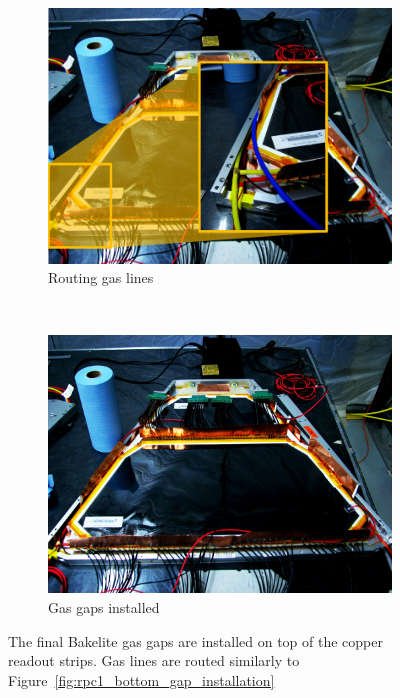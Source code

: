 \begin{figure}
  \centering
  \begin{subfigure}[b]{0.5\textwidth}
    \centering
    \includegraphics[width=\linewidth]{./figures/rpc1_construction_6b.jpg}
    \caption{Routing gas lines}
    \label{fig:rpc1_top_gas_line_detail}
  \end{subfigure}%
  ~
  \begin{subfigure}[b]{0.5\textwidth}
    \centering
    \includegraphics[width=\linewidth]{./figures/rpc1_construction_6}
    \caption{Gas gaps installed}
    \label{fig:rpc1_top_gap_installed}
  \end{subfigure}
  \caption{
    The final Bakelite gas gaps are installed on top of the copper readout
    strips. Gas lines are routed similarly to
    Figure~\ref{fig:rpc1_bottom_gap_installation}
  }
  \label{fig:rpc1_top_gap_installation}
\end{figure}

